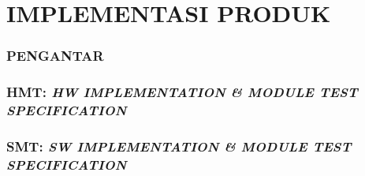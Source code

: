 \part*{\centering\textsf{\large IMPLEMENTASI PRODUK}}


\section*{\textcolor{sectioncolor}{\textsf{\large PENGANTAR}}}







\section*{\textcolor{sectioncolor}{\textsf{\large HMT: \textit{HW IMPLEMENTATION \& MODULE TEST SPECIFICATION}}}}









\section*{\textcolor{sectioncolor}{\textsf{\large SMT: \textit{SW IMPLEMENTATION \& MODULE TEST SPECIFICATION}}}}








\appendix
{}
